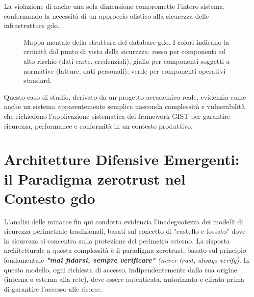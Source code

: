 La violazione di anche una sola dimensione compromette l'intero sistema, confermando la necessità di un approccio olistico alla sicurezza delle infrastrutture \gls{gdo}.

\begin{figure}[htbp]
\centering
{}
\caption{Mappa mentale della struttura del database \gls{gdo}. I colori indicano la criticità dal punto di vista della sicurezza: rosso per componenti ad alto rischio (dati carte, credenziali), giallo per componenti soggetti a normative (fatture, dati personali), verde per componenti operativi standard.}
\label{fig:database_mindmap}
\end{figure}

Questo caso di studio, derivato da un progetto accademico reale, evidenzia come anche un sistema apparentemente semplice nasconda complessità e vulnerabilità che richiedono l'applicazione sistematica del framework GIST per garantire sicurezza, performance e conformità in un contesto produttivo.

\section{\texorpdfstring{Architetture Difensive Emergenti: il Paradigma \gls{zerotrust} nel Contesto \gls{gdo}}{2.4 - Architetture Difensive Emergenti: il Paradigma Zero Trust nel Contesto GDO}}

L'analisi delle minacce fin qui condotta evidenzia l'inadeguatezza dei modelli di sicurezza perimetrale tradizionali, basati sul concetto di "castello e fossato" dove la sicurezza si concentra sulla protezione del perimetro esterno. La risposta architetturale a questa complessità è il paradigma \gls{zerotrust}, basato sul principio fondamentale \emph{\textbf{"mai fidarsi, sempre verificare"} (never trust, always verify)}. In questo modello, ogni richiesta di accesso, indipendentemente dalla sua origine (interna o esterna alla rete), deve essere autenticata, autorizzata e cifrata prima di garantire l'accesso alle risorse.

